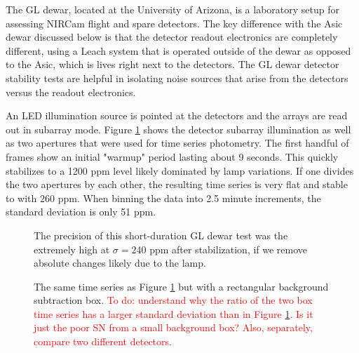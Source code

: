 \documentclass{aastex62}
\begin{document}
{The GL dewar, located at the University of Arizona, is a laboratory setup for assessing NIRCam flight and spare detectors.
The key difference with the Asic dewar discussed below is that the detector readout electronics are completely different, using a Leach system that is operated outside of the dewar as opposed to the Asic, which is lives right next to the detectors.
The GL dewar detector stability tests are helpful in isolating noise sources that arise from the detectors versus the readout electronics.

An LED illumination source is pointed at the detectors and the arrays are read out in subarray mode.
Figure \ref{fig:GLtSeries} shows the detector subarray illumination as well as two apertures that were used for time series photometry.
The first handful of frames show an initial "warmup" period lasting about 9 seconds.
This quickly stabilizes to a 1200 ppm level likely dominated by lamp variations.
If one divides the two apertures by each other, the resulting time series is very flat and stable to with 260 ppm.
When binning the data into 2.5 minute increments, the standard deviation is only 51 ppm.


\begin{figure}
\caption{The precision of this short-duration GL dewar test was the extremely high at $\sigma=$240 ppm after stabilization, if we remove absolute changes likely due to the lamp.
}\label{fig:GLtSeries}
\end{figure}

\begin{figure}
\caption{The same time series as Figure \ref{fig:GLtSeries} but with a rectangular background subtraction box.
\textcolor{red}{To do: understand why the ratio of the two box time series has a larger standard deviation than in Figure \ref{fig:GLtSeries}. Is it just the poor SN from a small background box? Also, separately, compare two different detectors.}
}\label{fig:GLtSeriesBacksub}
\end{figure}

}
\end{document}
